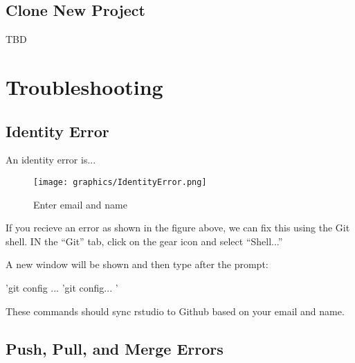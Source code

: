 \documentclass[12pt]{../SOP4_alpha}\usepackage[]{graphicx}\usepackage[]{xcolor}
\begin{document}
\subsection{Clone New Project}

TBD




\section{Troubleshooting}

\subsection {Identity Error}

\NP An identity error is... 

\begin{figure}[H]
\centering
\texttt{[image: graphics/IdentityError.png]}
\caption{Enter email and name}
\end{figure}

\NP If you recieve an error as shown in the figure above, we can fix this using the Git shell. IN the ``Git'' tab, click on the gear icon and select ``Shell...'' 

\NP A new window will be shown and then type after the prompt:

'git config ...
'git config... '

\NP These commands should sync rstudio to Github based on your email and name.


\subsection{Push, Pull, and Merge Errors}
\end{document}
